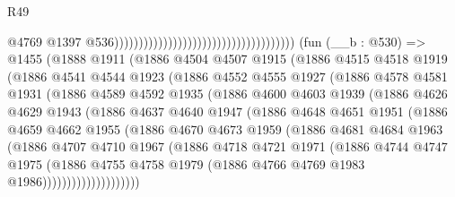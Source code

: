 \begin{lexlean}{R49}
\begin{coremodule}
                                                                              @4769
                                                                              @1397
                                                                              @536)))))))))))))))))))))))))))))))))))))
    (fun (__b : @530) =>
    @1455
      (@1888
        @1911
        (@1886
          @4504
          @4507
          @1915
          (@1886
            @4515
            @4518
            @1919
            (@1886
              @4541
              @4544
              @1923
              (@1886
                @4552
                @4555
                @1927
                (@1886
                  @4578
                  @4581
                  @1931
                  (@1886
                    @4589
                    @4592
                    @1935
                    (@1886
                      @4600
                      @4603
                      @1939
                      (@1886
                        @4626
                        @4629
                        @1943
                        (@1886
                          @4637
                          @4640
                          @1947
                          (@1886
                            @4648
                            @4651
                            @1951
                            (@1886
                              @4659
                              @4662
                              @1955
                              (@1886
                                @4670
                                @4673
                                @1959
                                (@1886
                                  @4681
                                  @4684
                                  @1963
                                  (@1886
                                    @4707
                                    @4710
                                    @1967
                                    (@1886
                                      @4718
                                      @4721
                                      @1971
                                      (@1886
                                        @4744
                                        @4747
                                        @1975
                                        (@1886
                                          @4755
                                          @4758
                                          @1979
                                          (@1886 @4766 @4769 @1983 @1986))))))))))))))))))))

\end{coremodule}
\end{lexlean}
